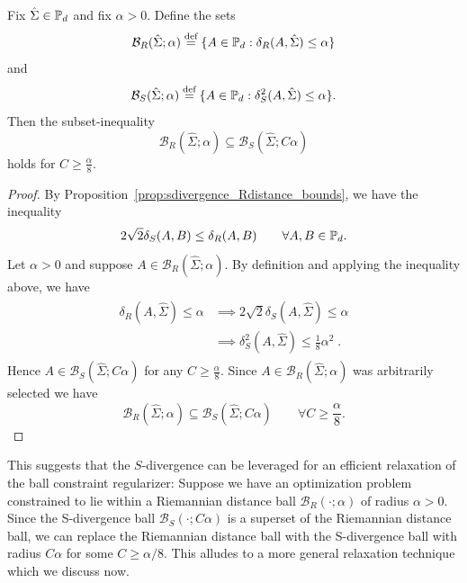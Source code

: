 \documentclass[sn-nature]{sn-jnl}%
\theoremstyle{thmstyleone}%
\theoremstyle{thmstyletwo}%
\theoremstyle{thmstylethree}%
\begin{document}
%
    \begin{prop}\label{prop:Rball_SBall}
        Fix $\hat{\Sigma} \in \mathbb{P}_d$ and fix $\alpha>0$. Define the  sets 
        \begin{equation*}
            \mathcal{B}_R(\hat{\Sigma}; \alpha) \defas \{A \in \pd : \delta_R(A,\hat{\Sigma}) \leq \alpha\} %
        \end{equation*}
        and 
        \begin{equation*}
            \mathcal{B}_S(\hat{\Sigma}; \alpha) \stackrel{\text{def}}{=} \{A \in \mathbb{P}_d : \delta_S^2 (A,\hat{\Sigma}) \leq \alpha\}.
        \end{equation*} %
        Then the subset-inequality
        \begin{equation*}
            \mathcal{B}_R(\hat{\Sigma}; \alpha) \subseteq \mathcal{B}_S(\hat{\Sigma}; C\alpha) 
        \end{equation*}
        holds for $C \geq \frac{\alpha}{8}$.
    \end{prop}


\begin{proof}
    By Proposition~\ref{prop:sdivergence_Rdistance_bounds}, we have the inequality 
    \begin{equation*}
        2 \sqrt{2} \delta_S(A,B) \leq \delta_R(A,B) \qquad \forall A, B \in \mathbb{P}_d.
    \end{equation*}
   Let $\alpha>0$ and suppose $A \in \mathcal{B}_R(\hat{\Sigma}; \alpha)$. By definition and applying the inequality above, we have
    \begin{align*}
        \begin{split}
            \delta_R(A, \hat{\Sigma}) \leq \alpha &\implies 2 \sqrt{2}\delta_S (A,\hat{\Sigma}) \leq \alpha
            \\& \implies \delta_S^2(A, \hat{\Sigma}) \leq \frac{1}{8}\alpha^2 \; .
        \end{split}
    \end{align*}
    Hence $A \in \mathcal{B}_S(\hat{\Sigma}; C\alpha)$ for any $C \geq \frac{\alpha}{8}$. Since $A \in \mathcal{B}_R(\hat{\Sigma}; \alpha)$ was arbitrarily selected we have 
    \[
    \mathcal{B}_R(\hat{\Sigma}; \alpha) \subseteq \mathcal{B}_S(\hat{\Sigma}; C\alpha) \qquad \forall C \geq \frac{\alpha}{8}.
    \]
\end{proof}
%
This suggests that the $S$-divergence can be leveraged for an efficient relaxation of the ball constraint regularizer: Suppose we have an optimization problem constrained to lie within a Riemannian distance ball $\mathcal{B}_R(\cdot; \alpha)$ of radius $\alpha >0$. Since the S-divergence ball $\mathcal{B}_S(\cdot; C\alpha)$ is a superset of the Riemannian distance ball, we can replace the Riemannian distance ball with the S-divergence ball with radius $C \alpha$ for some $C \geq \alpha /8.$  This alludes to a more general relaxation technique which we discuss now.
\end{document}
